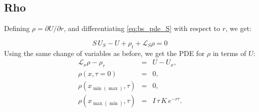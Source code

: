 \documentclass[11pt, letterpaper]{article}
\begin{document}
    \subsection{Rho}
    Defining $\rho = \partial U / \partial r$, and differentiating \eqref{eq:bs_pde_S} with respect to $r$, we get:
    
    \begin{equation}
        S\, U_S - U + \rho_t + \mathcal{L}_S \rho = 0
    \end{equation}
    Using the same change of variables as before, we get the PDE for $\rho$ in terms of $U$:
    \begin{eqnarray}
        \mathcal{L}_x \rho - \rho_\tau &=& U - U_{x},\\
        \rho(x, \tau = 0) &=& 0,\\
        \rho(x_{\min(\max)}, \tau) &=& 0,\\
        \rho(x_{\max(\min)}, \tau) & = & I\, \tau\, K\, e^{-r \tau}.
    \end{eqnarray}
\end{document}
